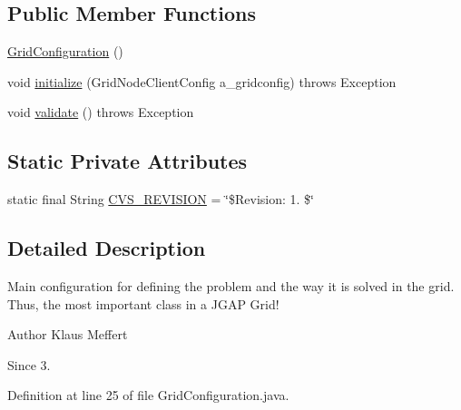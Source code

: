 \subsection*{Public Member Functions}
\begin{DoxyCompactItemize}
\item 
\hyperlink{classexamples_1_1grid_1_1evolution_distributed_1_1_grid_configuration_ac064e5573455facff575817a5c73b873}{Grid\-Configuration} ()
\item 
void \hyperlink{classexamples_1_1grid_1_1evolution_distributed_1_1_grid_configuration_a0c6986b6e2b3819e584da7a5288d1f4c}{initialize} (Grid\-Node\-Client\-Config a\-\_\-gridconfig)  throws Exception 
\item 
void \hyperlink{classexamples_1_1grid_1_1evolution_distributed_1_1_grid_configuration_a5813342499e75726484fe172618bd108}{validate} ()  throws Exception 
\end{DoxyCompactItemize}
\subsection*{Static Private Attributes}
\begin{DoxyCompactItemize}
\item 
static final String \hyperlink{classexamples_1_1grid_1_1evolution_distributed_1_1_grid_configuration_a3b6918231747bf059be879be6f5b8faa}{C\-V\-S\-\_\-\-R\-E\-V\-I\-S\-I\-O\-N} = \char`\"{}\$Revision\-: 1. \$\char`\"{}
\end{DoxyCompactItemize}


\subsection{Detailed Description}
Main configuration for defining the problem and the way it is solved in the grid. Thus, the most important class in a J\-G\-A\-P Grid!

\begin{DoxyAuthor}{Author}
Klaus Meffert 
\end{DoxyAuthor}
\begin{DoxySince}{Since}
3. 
\end{DoxySince}


Definition at line 25 of file Grid\-Configuration.\-java.



